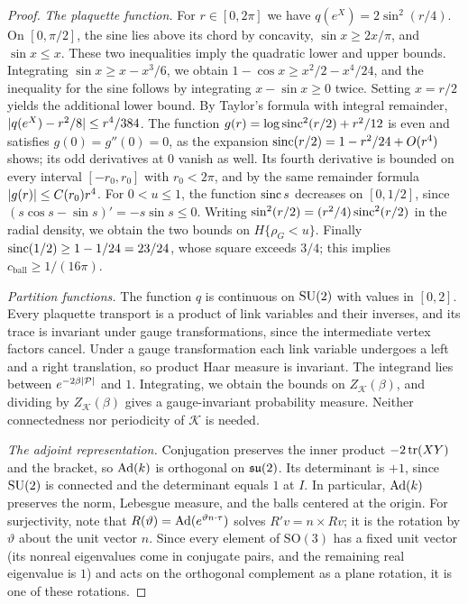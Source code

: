 \begin{proof}
\emph{The plaquette function.} For $r\in[0,2\pi]$ we have $q(e^X)=2\sin^2(r/4)$. On $[0,\pi/2]$, the sine lies above its chord by concavity, $\sin x\ge2x/\pi$, and $\sin x\le x$. These two inequalities imply the quadratic lower and upper bounds. Integrating $\sin x\ge x-x^3/6$, we obtain $1-\cos x\ge x^2/2-x^4/24$, and the inequality for the sine follows by integrating $x-\sin x\ge0$ twice. Setting $x=r/2$ yields the additional lower bound. By Taylor's formula with integral remainder, $\lvert q(e^X)-r^2/8\rvert\le r^4/384$. The function $g(r)=\log\operatorname{sinc}^2(r/2)+r^2/12$ is even and satisfies $g(0)=g''(0)=0$, as the expansion $\operatorname{sinc}(r/2)=1-r^2/24+O(r^4)$ shows; its odd derivatives at $0$ vanish as well. Its fourth derivative is bounded on every interval $[-r_0,r_0]$ with $r_0<2\pi$, and by the same remainder formula $\lvert g(r)\rvert\le C(r_0)r^4$. For $0<u\le1$, the function $\operatorname{sinc} s$ decreases on $[0,1/2]$, since $(s\cos s-\sin s)'=-s\sin s\le0$. Writing $\sin^2(r/2)=(r^2/4)\operatorname{sinc}^2(r/2)$ in the radial density, we obtain the two bounds on $H\{\rho_G<u\}$. Finally $\operatorname{sinc}(1/2)\ge1-1/24=23/24$, whose square exceeds $3/4$; this implies $c_{\mathrm{ball}}\ge1/(16\pi)$.

\emph{Partition functions.} The function $q$ is continuous on $\mathrm{SU}(2)$ with values in $[0,2]$. Every plaquette transport is a product of link variables and their inverses, and its trace is invariant under gauge transformations, since the intermediate vertex factors cancel. Under a gauge transformation each link variable undergoes a left and a right translation, so product Haar measure is invariant. The integrand lies between $e^{-2\beta\lvert \mathcal P\rvert}$ and $1$. Integrating, we obtain the bounds on $Z_{\mathcal K}(\beta)$, and dividing by $Z_{\mathcal K}(\beta)$ gives a gauge-invariant probability measure. Neither connectedness nor periodicity of $\mathcal K$ is needed.

\emph{The adjoint representation.} Conjugation preserves the inner product $-2\operatorname{tr}(XY)$ and the bracket, so $\operatorname{Ad}(k)$ is orthogonal on $\mathfrak{su}(2)$. Its determinant is $+1$, since $\mathrm{SU}(2)$ is connected and the determinant equals $1$ at $I$. In particular, $\operatorname{Ad}(k)$ preserves the norm, Lebesgue measure, and the balls centered at the origin. For surjectivity, note that $R(\vartheta)=\operatorname{Ad}(e^{\vartheta n\cdot\tau})$ solves $R'v=n\times Rv$; it is the rotation by $\vartheta$ about the unit vector $n$. Since every element of $\mathrm{SO}(3)$ has a fixed unit vector (its nonreal eigenvalues come in conjugate pairs, and the remaining real eigenvalue is $1$) and acts on the orthogonal complement as a plane rotation, it is one of these rotations.


\end{proof}
